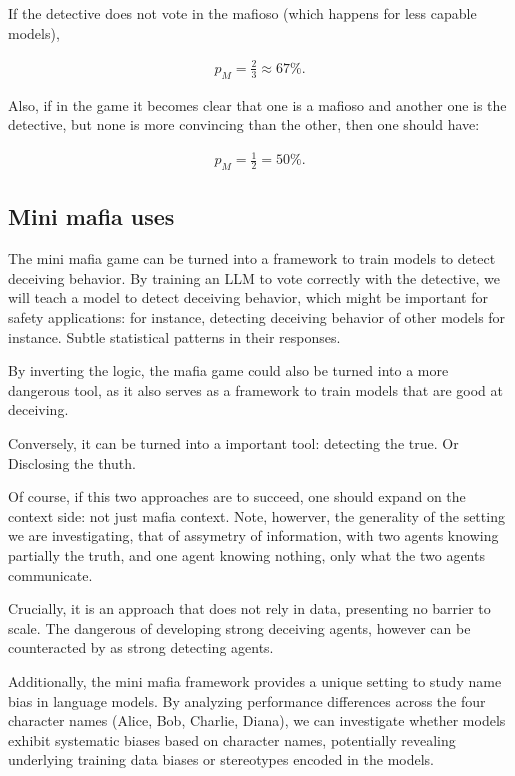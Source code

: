 \documentclass{article}
\begin{document}
If the detective does not vote in the mafioso (which happens for less capable models), 

\begin{align}
    p_M=\frac{2}{3}\approx 67\%.
\end{align}

Also, if in the game it becomes clear that one is a mafioso and another one is the detective, but none is more convincing than the other, then one should have:

\begin{align}
    p_M=\frac{1}{2}=50\%.
\end{align}




\subsection{Mini mafia uses}

The mini mafia game can be turned into a framework to train models to detect deceiving behavior. By training an LLM to vote correctly with the detective, we will teach a model to detect deceiving behavior, which might be important for safety applications: for instance, detecting deceiving behavior of other models for instance. Subtle statistical patterns in their responses.

By inverting the logic, the mafia game could also be turned into a more dangerous tool, as it also serves as a framework to train models that are good at deceiving.

Conversely, it can be turned into a important tool: detecting the true. Or Disclosing the thuth.

Of course, if this two approaches are to succeed, one should expand on the context side: not just mafia context. Note, howerver, the generality of the setting we are investigating, that of assymetry of information, with two agents knowing partially the truth, and one agent knowing nothing, only what the two agents communicate.

Crucially, it is an approach that does not rely in data, presenting no barrier to scale. The dangerous of developing strong deceiving agents, however can be counteracted by as strong detecting agents.

Additionally, the mini mafia framework provides a unique setting to study name bias in language models. By analyzing performance differences across the four character names (Alice, Bob, Charlie, Diana), we can investigate whether models exhibit systematic biases based on character names, potentially revealing underlying training data biases or stereotypes encoded in the models.
\end{document}
